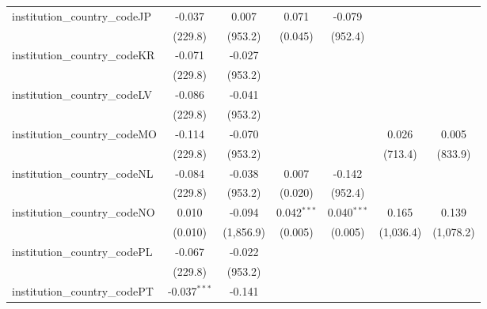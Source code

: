 \begin{tabular}{lcccccc}
   institution\_country\_codeJP          & -0.037         & 0.007         & 0.071          & -0.079        &               &   \\   
                                         & (229.8)        & (953.2)       & (0.045)        & (952.4)       &               &   \\   
   institution\_country\_codeKR          & -0.071         & -0.027        &                &               &               &   \\   
                                         & (229.8)        & (953.2)       &                &               &               &   \\   
   institution\_country\_codeLV          & -0.086         & -0.041        &                &               &               &   \\   
                                         & (229.8)        & (953.2)       &                &               &               &   \\   
   institution\_country\_codeMO          & -0.114         & -0.070        &                &               & 0.026         & 0.005\\   
                                         & (229.8)        & (953.2)       &                &               & (713.4)       & (833.9)\\   
   institution\_country\_codeNL          & -0.084         & -0.038        & 0.007          & -0.142        &               &   \\   
                                         & (229.8)        & (953.2)       & (0.020)        & (952.4)       &               &   \\   
   institution\_country\_codeNO          & 0.010          & -0.094        & 0.042$^{***}$  & 0.040$^{***}$ & 0.165         & 0.139\\   
                                         & (0.010)        & (1,856.9)     & (0.005)        & (0.005)       & (1,036.4)     & (1,078.2)\\   
   institution\_country\_codePL          & -0.067         & -0.022        &                &               &               &   \\   
                                         & (229.8)        & (953.2)       &                &               &               &   \\   
   institution\_country\_codePT          & -0.037$^{***}$ & -0.141        &                &               &               &   \\   

\end{tabular}
